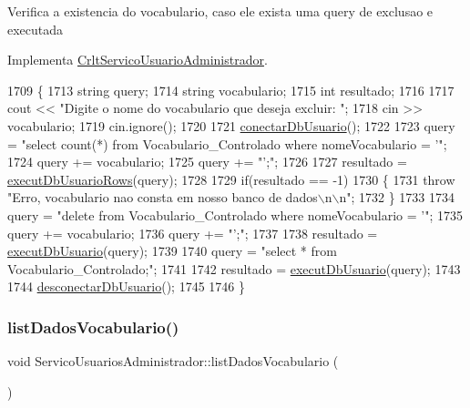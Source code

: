 Verifica a existencia do vocabulario, caso ele exista uma query de exclusao e executada

Implementa \mbox{\hyperlink{class_crlt_servico_usuario_administrador_a55d722de48eb016aef0d7290cb36e51d}{Crlt\+Servico\+Usuario\+Administrador}}.


\begin{DoxyCode}
1709 \{
1713     \textcolor{keywordtype}{string} query;
1714     \textcolor{keywordtype}{string} vocabulario;
1715     \textcolor{keywordtype}{int} resultado;
1716 
1717     cout << \textcolor{stringliteral}{"Digite o nome do vocabulario que deseja excluir: "};
1718     cin >> vocabulario;
1719     cin.ignore();
1720 
1721     \mbox{\hyperlink{comando_sql_8cpp_a4f89ddcbc4cf8f2587d89f72f8c7900d}{conectarDbUsuario}}();
1722 
1723     query = \textcolor{stringliteral}{"select count(*) from Vocabulario\_Controlado where nomeVocabulario = '"};
1724     query += vocabulario;
1725     query += \textcolor{stringliteral}{"';"};
1726 
1727     resultado = \mbox{\hyperlink{comando_sql_8cpp_af54952694f2fa7d76f969fb74b853cb9}{executDbUsuarioRows}}(query);
1728 
1729     \textcolor{keywordflow}{if}(resultado == -1)
1730     \{
1731       \textcolor{keywordflow}{throw} \textcolor{stringliteral}{"Erro, vocabulario nao consta em nosso banco de dados\(\backslash\)n\(\backslash\)n"};
1732     \}
1733 
1734     query = \textcolor{stringliteral}{"delete from Vocabulario\_Controlado where nomeVocabulario = '"};
1735     query += vocabulario;
1736     query += \textcolor{stringliteral}{"';"};
1737 
1738     resultado = \mbox{\hyperlink{comando_sql_8cpp_a748197580e7f9acdbf48c78de1f7924b}{executDbUsuario}}(query);
1739 
1740     query = \textcolor{stringliteral}{"select * from Vocabulario\_Controlado;"};
1741 
1742     resultado = \mbox{\hyperlink{comando_sql_8cpp_a748197580e7f9acdbf48c78de1f7924b}{executDbUsuario}}(query);
1743 
1744     \mbox{\hyperlink{comando_sql_8cpp_a969be9911913568e30d4ae8963338bc3}{desconectarDbUsuario}}();
1745 
1746 \}
\end{DoxyCode}
\mbox{\label{class_servico_usuarios_administrador_adddc69a01b3ffb101f3a0b5825dde223}} 
\subsubsection{\texorpdfstring{list\+Dados\+Vocabulario()}{listDadosVocabulario()}}
{\footnotesize\ttfamily void Servico\+Usuarios\+Administrador\+::list\+Dados\+Vocabulario (\begin{DoxyParamCaption}{ }\end{DoxyParamCaption})\hspace{0.3cm}{\ttfamily [virtual]}}



